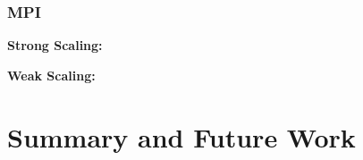 \documentclass{scrartcl}
\begin{document}
  \subsubsection{MPI}
  \textbf{Strong Scaling:}
  
  \textbf{Weak Scaling:}
  
    \section{Summary and Future Work}
\end{document}
